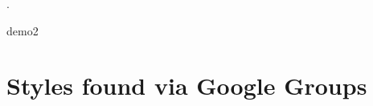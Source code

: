 . 
\begin{showchapterstyle}{demo2}
\makeatletter
{}
\makeatother
\end{showchapterstyle}




\chapter{Styles found via Google Groups}

\enlargethispage{\onelineskip}


